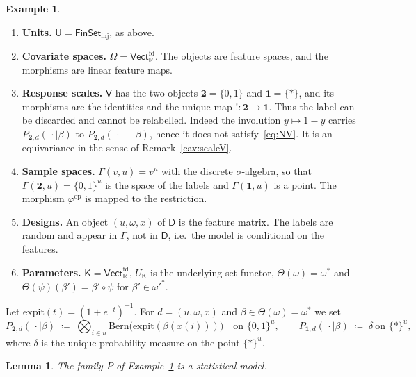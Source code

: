 \documentclass[11pt,a4paper]{article}
\theoremstyle{plain}
\newtheorem{lemma}[theorem]{Lemma}
\theoremstyle{definition}
\newtheorem{example}[theorem]{Example}
\theoremstyle{remark}
\newcommand{\cat}[1]{\mathsf{#1}}
\newcommand{\catU}{\cat{U}}
\newcommand{\catV}{\cat{V}}
\newcommand{\catO}{\cat{\Omega}}
\newcommand{\catD}{\cat{D}}
\newcommand{\catK}{\cat{K}}
\newcommand{\FinSet}{\cat{FinSet}}
\newcommand{\op}{\mathrm{op}}
\newcommand{\R}{\mathbb{R}}
\newcommand{\Vect}{\cat{Vect}}
\newcommand{\Bern}{\mathrm{Bern}}
\newcommand{\expit}{\mathrm{expit}}
\begin{document}
\begin{example}\label{ex:logreg}
\leavevmode
\begin{enumerate}
\item \textbf{Units.} $\catU = \FinSet_{\mathrm{inj}}$, as above.

\item \textbf{Covariate spaces.} $\catO = \Vect_{\R}^{\mathrm{fd}}$. The
objects are feature spaces, and the morphisms are linear feature maps.

\item \textbf{Response scales.} $\catV$ has the two objects
$\mathbf{2}=\{0,1\}$ and $\mathbf{1}=\{*\}$, and its morphisms are the
identities and the unique map $!\colon\mathbf{2}\to\mathbf{1}$. Thus the label
can be discarded and cannot be relabelled. Indeed the involution
$y \mapsto 1-y$ carries $P_{\mathbf{2},d}(\,\cdot\mid\beta)$ to
$P_{\mathbf{2},d}(\,\cdot\mid -\beta)$, hence it does not
satisfy~\eqref{eq:NV}. It is an equivariance in the sense of
Remark~\ref{cav:scaleV}.

\item \textbf{Sample spaces.} $\Gamma(v,u)=v^{u}$ with the discrete
$\sigma$-algebra, so that $\Gamma(\mathbf{2},u)=\{0,1\}^{u}$ is the space of
the labels and $\Gamma(\mathbf{1},u)$ is a point. The morphism $\varphi^{\op}$
is mapped to the restriction.

\item \textbf{Designs.} An object $(u,\omega,x)$ of $\catD$ is the feature
matrix. The labels are random and appear in $\Gamma$, not in $\catD$, i.e.\ the
model is conditional on the features.

\item \textbf{Parameters.} $\catK = \Vect_{\R}^{\mathrm{fd}}$, $U_{\catK}$ is
the underlying-set functor, $\Theta(\omega)=\omega^{*}$ and
$\Theta(\psi)(\beta') = \beta'\circ\psi$ for $\beta' \in \omega'^{*}$.
\end{enumerate}

\noindent Let $\expit(t)=(1+e^{-t})^{-1}$. For $d = (u,\omega,x)$ and
$\beta \in \Theta(\omega) = \omega^{*}$ we set
\[
P_{\mathbf{2},d}(\,\cdot\mid\beta)
\;\coloneqq\; \bigotimes_{i\in u}\Bern\!\bigl(\expit(\beta(x(i)))\bigr)
\quad\text{on }\{0,1\}^{u},
\qquad
P_{\mathbf{1},d}(\,\cdot\mid\beta) \;\coloneqq\; \delta \ \text{on } \{*\}^{u},
\]
where $\delta$ is the unique probability measure on the point $\{*\}^{u}$.
\end{example}

\begin{lemma}\label{lem:logreg-model}
The family $P$ of Example~\ref{ex:logreg} is a statistical model.
\end{lemma}
\end{document}
